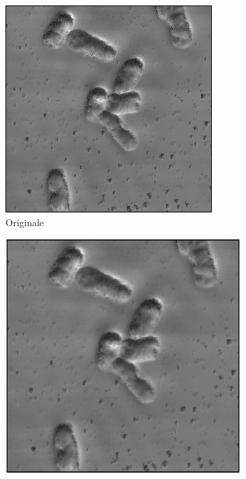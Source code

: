 \documentclass[../main.tex]{subfiles}
\begin{document}
\begin{enumerate}
	\begin{figure}[ht]
		\centering
		\begin{subfigure}{0.4\linewidth}
			\includegraphics[keepaspectratio, width=\linewidth]{images/ec_o2a.png}
			\caption{Originale}
		\end{subfigure}
		\hspace{10pt}
		\begin{subfigure}{0.4\linewidth}
			\includegraphics[keepaspectratio, width=\linewidth]{images/gauss_05.png}

\end{subfigure}
\end{figure}
\end{enumerate}
\end{document}
